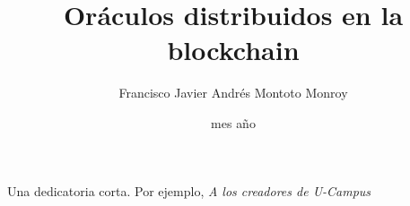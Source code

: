 \documentclass[upright, contnum]{umemoria}
\author{Francisco Javier Andr\'es Montoto Monroy}
\title{Or\'aculos distribuidos en la blockchain}
\date{mes {a\~no}}
\begin{document}
\frontmatter
\maketitle

\begin{abstract}

\end{abstract}

\begin{dedicatoria} %
Una dedicatoria corta. Por ejemplo, \emph{A los creadores de U-Campus}
\end{dedicatoria}

\begin{thanks} %
\lipsum[1-2]
\end{thanks}
\cleardoublepage

\tableofcontents
\listoftables %
\listoffigures %

\mainmatter






\printbibliography
\end{document}
